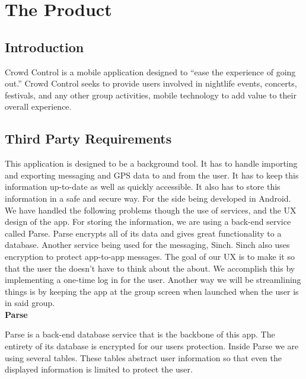 


\renewcommand{\familydefault}{\sfdefault}
\renewcommand{\arraystretch}{1.5}

\chapter{The Product}

\section{Introduction}

Crowd Control is a mobile application designed to “ease the experience of going out.” Crowd Control seeks to provide users involved in nightlife events, concerts, festivals, and any other group activities, mobile technology to add value to their overall experience. 

\section{Third Party Requirements}

This application is designed to be a background tool. It has to handle importing and exporting messaging and GPS data to and from the user. It has to keep this information up-to-date as well as quickly accessible. It also has to store this information in a safe and secure way.
For the side being developed in Android. We have handled the following problems though the use of services, and the UX design of the app. For storing the information, we are using a back-end service called Parse. Parse encrypts all of its data and gives great functionality to a database. Another service being used for the messaging, Sinch. Sinch also uses encryption to protect app-to-app messages.
The goal of our UX is to make it so that the user the doesn't have to think about the about. We accomplish this by implementing a one-time log in for the user. Another way we will be streamlining things is by keeping the app at the group screen when launched when the user is in said group.\\

\noindent
\textbf{Parse}

Parse is a back-end database service that is the backbone of this app. The entirety of its database is encrypted for our users protection. Inside Parse we are using several tables. These tables abstract user information so that even the displayed information is limited to protect the user.\\

